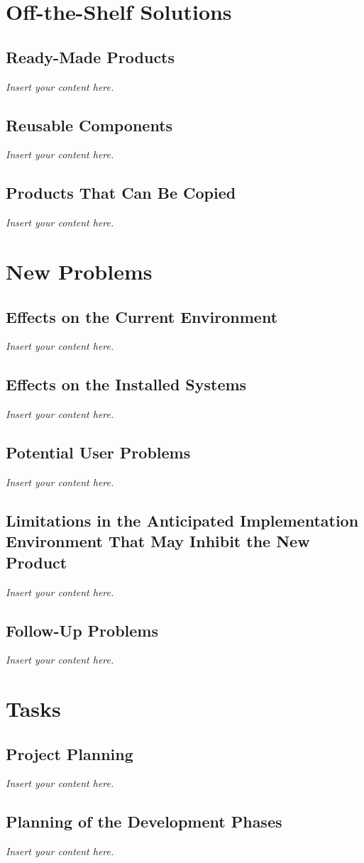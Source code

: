 \documentclass[12pt]{article}
\newcommand{\lips}{\textit{Insert your content here.}}
\begin{document}
\section{Off-the-Shelf Solutions}
\subsection{Ready-Made Products}
\lips
\subsection{Reusable Components}
\lips
\subsection{Products That Can Be Copied}
\lips

\section{New Problems}
\subsection{Effects on the Current Environment}
\lips
\subsection{Effects on the Installed Systems}
\lips
\subsection{Potential User Problems}
\lips
\subsection{Limitations in the Anticipated Implementation Environment That May
Inhibit the New Product}
\lips
\subsection{Follow-Up Problems}
\lips

\section{Tasks}
\subsection{Project Planning}
\lips
\subsection{Planning of the Development Phases}
\lips
\end{document}
